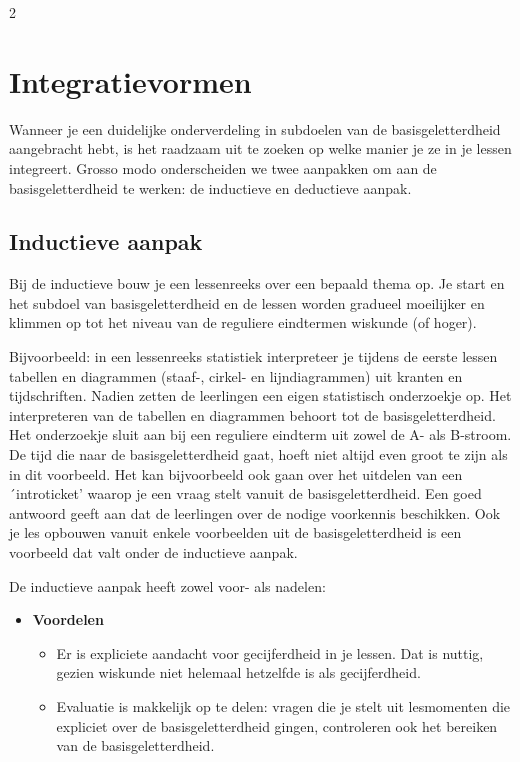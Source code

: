 \begin{multicols}{2}

\section{Integratievormen}
Wanneer je een duidelijke onderverdeling in subdoelen van de basisgeletterdheid aangebracht hebt, is het raadzaam uit te zoeken op welke manier je ze in je lessen integreert. Grosso modo onderscheiden we twee aanpakken om aan de basisgeletterdheid te werken: de inductieve en deductieve aanpak.

\subsection{Inductieve aanpak}


Bij de inductieve bouw je een lessenreeks over een bepaald thema op. Je start en het subdoel van basisgeletterdheid en de lessen worden gradueel moeilijker en klimmen op tot het niveau van de reguliere eindtermen wiskunde (of hoger).


 Bijvoorbeeld: in een lessenreeks statistiek interpreteer je tijdens de eerste lessen tabellen en diagrammen (staaf-, cirkel- en lijndiagrammen) uit kranten en tijdschriften. Nadien zetten de leerlingen een eigen statistisch onderzoekje op. Het interpreteren van de tabellen en diagrammen behoort tot de basisgeletterdheid. Het onderzoekje sluit aan bij een reguliere eindterm uit zowel de A- als B-stroom. De tijd die naar de basisgeletterdheid gaat, hoeft niet altijd even groot te zijn als in dit voorbeeld. Het kan bijvoorbeeld ook gaan over het uitdelen van een ´introticket' waarop je een vraag stelt vanuit de basisgeletterdheid. Een goed antwoord geeft aan dat de leerlingen over de nodige voorkennis beschikken. Ook je les opbouwen vanuit enkele voorbeelden uit de basisgeletterdheid is een voorbeeld dat valt onder de inductieve aanpak. 

De inductieve aanpak heeft zowel voor- als nadelen:
\begin{itemize}
    \item \textbf{Voordelen}
    \begin{itemize}
    \item Er is expliciete aandacht voor gecijferdheid in je lessen. Dat is nuttig, gezien wiskunde niet helemaal hetzelfde is als gecijferdheid.
        \item Evaluatie is makkelijk op te delen: vragen die je stelt uit lesmomenten die expliciet over de basisgeletterdheid gingen, controleren ook het bereiken van de basisgeletterdheid.
        

\end{itemize}
\end{itemize}
\end{multicols}

